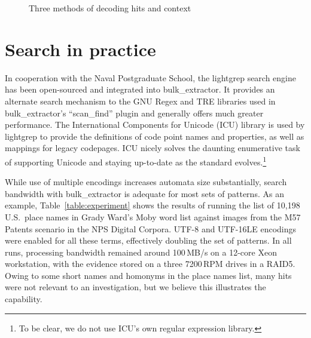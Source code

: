 \documentclass[5p,final,number,sort&compress]{elsarticle}
\begin{document}
\begin{figure}[ht]
{
}
\caption{Three methods of decoding hits and context\label{fig:decode}}
\end{figure}

\section{Search in practice}

In cooperation with the Naval Postgraduate School, the lightgrep search engine has been open-sourced and integrated into bulk\_extractor. It provides an alternate search mechanism to the GNU Regex and TRE libraries used in bulk\_extractor's ``scan\_find'' plugin and generally offers much greater performance. The International Components for Unicode (ICU) library is used by lightgrep to provide the definitions of code point names and properties, as well as mappings for legacy codepages. ICU nicely solves the daunting enumerative task of supporting Unicode and staying up-to-date as the standard evolves.\footnote{To be clear, we do not use ICU's own regular expression library.}

While use of multiple encodings increases automata size substantially, search bandwidth with bulk\_extractor is adequate for most sets of patterns. As an example, Table~\ref{table:experiment} shows the results of running the list of 10,198 U.S.\ place names in Grady Ward's Moby word list against images from the M57 Patents scenario in the NPS Digital Corpora. UTF-8 and UTF-16LE encodings were enabled for all these terms, effectively doubling the set of patterns. In all runs, processing bandwidth remained around 100\,MB/s on a 12-core Xeon workstation, with the evidence stored on a three 7200\,RPM drives in a RAID5. Owing to some short names and homonyms in the place names list, many hits were not relevant to an investigation, but we believe this illustrates the capability.
\end{document}
